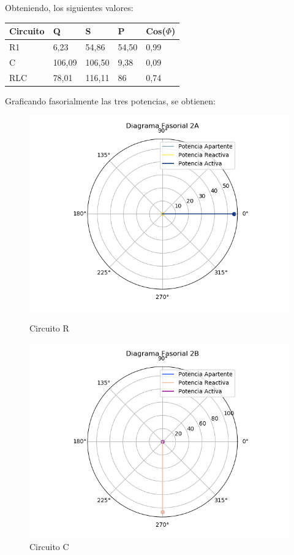 \documentclass[a4paper]{article}
\begin{document}
Obteniendo, los siguientes valores:

\begin{table}[H]
\begin{tabular}{lllll}
\hline
Circuito & Q      & S      & P     & Cos($\Phi$) \\ \hline
R1       & 6,23   & 54,86  & 54,50 & 0,99        \\
C        & 106,09 & 106,50 & 9,38  & 0,09        \\
RLC      & 78,01  & 116,11 & 86    & 0,74        \\ \hline
\end{tabular}
\end{table}

Graficando fasorialmente las tres potencias, se obtienen:

\begin{figure}[H]
\centering
\begin{minipage}{.5\textwidth}
  \centering
  \includegraphics[width=1.2\linewidth]{Diag-Fas-2A}
  \caption{Circuito R}
\end{minipage}%
\begin{minipage}{.5\textwidth}
  \centering
  \includegraphics[width=1.2\linewidth]{Diag-Fas-2B}
  \caption{Circuito C}


\end{minipage}
\end{figure}
\end{document}
